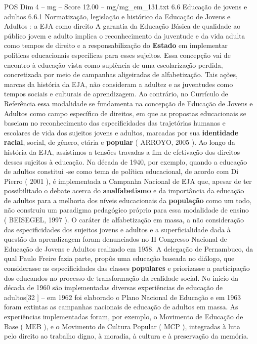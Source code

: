 \begin{textsample}{POS Dim 4 – mg – Score 12.00 – mg/mg\_em\_131.txt}  \label{ex:f4_pos_195}
6.6 Educação de jovens e adultos 6.6.1 Normatização, legislação e histórico da Educação de Jovens e Adultos : a EJA como direito A garantia da Educação Básica de qualidade ao público jovem e adulto implica o reconhecimento da juventude e da vida adulta como tempos de direito e a responsabilização do \textbf{Estado} em implementar políticas educacionais específicas para esses sujeitos.
Essa concepção vai de encontro à educação vista como suplência de uma escolarização perdida, concretizada por meio de campanhas aligeiradas de alfabetização.
Tais ações, marcas da história da EJA, não consideram a adultez e as juventudes como tempos sociais e culturais de aprendizagem.
Ao contrário, no Currículo de Referência essa modalidade se fundamenta na concepção de Educação de Jovens e Adultos como campo específico de direitos, em que as propostas educacionais se baseiam no reconhecimento das especificidades das trajetórias humanas e escolares de vida dos sujeitos jovens e adultos, marcadas por sua \textbf{identidade} \textbf{racial}, social, de gênero, etária e \textbf{popular} ( ARROYO, 2005 ).
Ao longo da história da EJA, assistimos a tensões travadas a fim de efetivação dos direitos desses sujeitos à educação.
Na década de 1940, por exemplo, quando a educação de adultos constitui -se como tema de política educacional, de acordo com Di Pierro ( 2001 ), é implementada a Campanha Nacional de EJA que, apesar de ter possibilitado o debate acerca do \textbf{analfabetismo} e da importância da educação de adultos para a melhoria dos níveis educacionais da \textbf{população} como um todo, não construiu um paradigma pedagógico próprio para essa modalidade de ensino ( BEISEGEL, 1997 ).
O caráter de alfabetização em massa, a não consideração das especificidades dos sujeitos jovens e adultos e a superficialidade dada à questão da aprendizagem foram denunciados no II Congresso Nacional de Educação de Jovens e Adultos realizado em 1958.
A delegação de Pernambuco, da qual Paulo Freire fazia parte, propôs uma educação baseada no diálogo, que considerasse as especificidades das classes \textbf{populares} e priorizasse a participação dos educandos no processo de transformação da realidade social.
No início da década de 1960 são implementadas diversas experiências de educação de adultos[32 ] – em 1962 foi elaborado o Plano Nacional de Educação e em 1963 foram extintas as campanhas nacionais de educação de adultos em massa.
As experiências implementadas foram, por exemplo, o Movimento de Educação de Base ( MEB ), e o Movimento de Cultura Popular ( MCP ), integradas à luta pelo direito ao trabalho digno, à moradia, à cultura e à preservação da memória.

\end{textsample}
